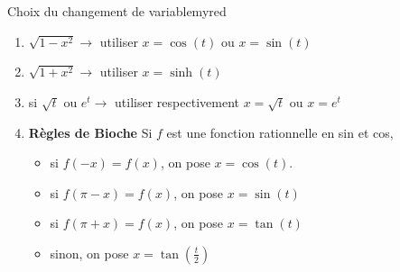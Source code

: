     \begin{omed}{Choix du changement de variable}{myred}
        \begin{enumerate}
            \item $\sqrt{1-x^2} \rightarrow$ utiliser $x = \cos(t)$ ou $x = \sin(t)$
            \item $\sqrt{1+x^2} \rightarrow$ utiliser $x = \sinh(t)$
            \item si $\sqrt{t}$ ou $e^t \rightarrow$ utiliser respectivement $x = \sqrt{t}$ ou $x = e^t$
            \item \textbf{Règles de Bioche} \quad Si $f$ est une fonction rationnelle en sin et cos, 
            \begin{itemize}
                \item si $f(-x) = f(x)$, on pose $x = \cos(t)$.
                \item si $f(\pi-x) = f(x)$, on pose $x = \sin(t)$
                \item si $f(\pi+x) = f(x)$, on pose $x = \tan(t)$
                \item sinon, on pose $x = \tan \left( \frac{t}{2} \right)$
            \end{itemize}
        \end{enumerate}
    \end{omed}


